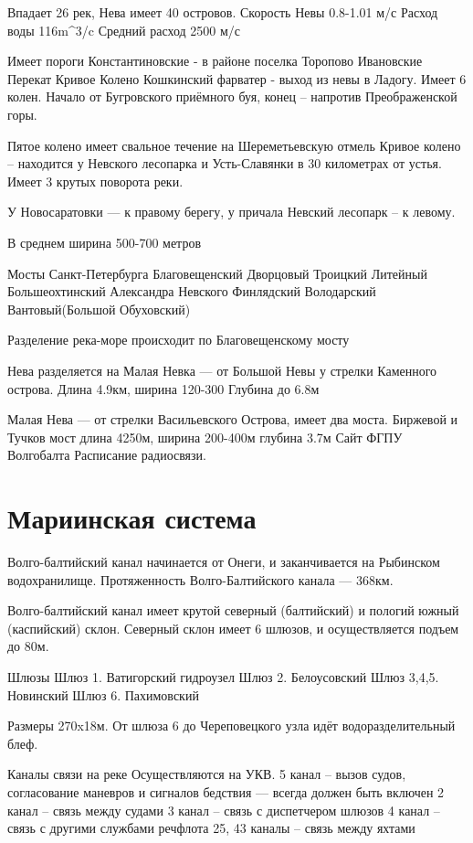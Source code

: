 \documentclass{article}        %
\begin{document}
\begin{description}
Впадает 26 рек, Нева имеет 40 островов.
Скорость Невы 0.8-1.01 м/с
Расход воды 116m^3/c	
Средний расход 2500 м/с

Имеет пороги
	Константиновские - в районе поселка Торопово
	Ивановские
	Перекат Кривое Колено
	Кошкинский фарватер - выход из невы в Ладогу. Имеет 6 колен. Начало от Бугровского приёмного буя, конец -- напротив Преображенской горы.

Пятое колено имеет свальное течение на Шереметьевскую отмель
Кривое колено -- находится у Невского лесопарка и Усть-Славянки в 30 километрах от устья. Имеет 3 крутых поворота реки.

У Новосаратовки --- к правому берегу, у причала Невский лесопарк -- к левому.

В среднем ширина 500-700 метров

Мосты Санкт-Петербурга
	Благовещенский
	Дворцовый
	Троицкий
	Литейный
	Большеохтинский
	Александра Невского
	Финлядский
	Володарский
	Вантовый(Большой Обуховский)

Разделение река-море происходит по Благовещенскому мосту

Нева разделяется на
	Малая Невка --- от Большой Невы у стрелки Каменного острова. Длина 4.9км, ширина 120-300 
		Глубина до 6.8м
	
	Малая Нева --- от стрелки Васильевского Острова, имеет два моста. Биржевой и Тучков мост
		длина 4250м, 
		ширина 200-400м
		глубина 3.7м
Сайт ФГПУ Волгобалта
	Расписание радиосвязи.

\section{Мариинская система}
Волго-балтийский канал начинается от Онеги, и заканчивается на Рыбинском водохранилище. Протяженность Волго-Балтийского канала --- 368км.

Волго-балтийский канал имеет крутой северный (балтийский) и пологий южный (каспийский) склон.
Северный склон имеет 6 шлюзов, и осуществляется подъем до 80м.

Шлюзы
	Шлюз 1. Ватигорский гидроузел
	Шлюз 2. Белоусовский
	Шлюз 3,4,5. Новинский
	Шлюз 6. Пахимовский

Размеры 270x18м.
От шлюза 6 до Череповецкого узла идёт водоразделительный блеф.

Каналы связи на реке
Осуществляются на УКВ.
	5 канал -- вызов судов, согласование маневров и 
		сигналов бедствия --- всегда должен быть включен
	2 канал -- связь между судами
	3 канал -- связь с диспетчером шлюзов
	4 канал -- связь с другими службами речфлота
	25, 43 каналы -- связь между яхтами


\end{description}
\end{document}
